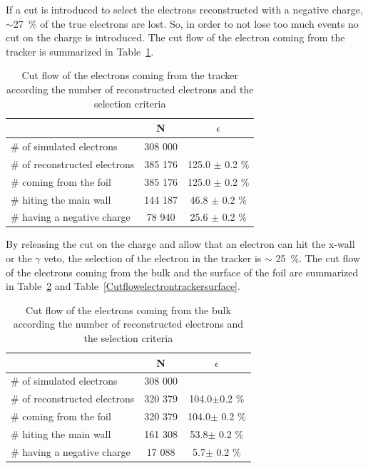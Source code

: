 \documentclass[main.tex]{subfiles}
\begin{document}
\bigskip 


\noindent If a cut is introduced to select the electrons reconstructed with a negative charge, $\sim$27~\% of the true electrons are lost. So, in order to not lose too much events no cut on the charge is introduced.  The cut flow of the electron coming from the tracker is summarized in Table~\ref{Cutflowelectrontracker}. 

\begin{table}[h!]
\begin{center}
\begin{tabular}{l|c|c}
 & N & $\epsilon$ \\
\toprule
$\#$ of simulated electrons & 308 000 & \\
\hline
$\#$ of reconstructed electrons & 385 176 & 125.0 $\pm$ 0.2 \% \\
$\#$ coming from the foil       & 385 176 & 125.0 $\pm$ 0.2 \%\\
$\#$ hiting the main wall       & 144 187 & 46.8  $\pm$ 0.2 \%\\
$\#$ having a negative charge   & 78 940  & 25.6  $\pm$ 0.2 \%\\
\bottomrule
\end{tabular}
\end{center}
\caption{Cut flow of the electrons coming from the tracker according the number of reconstructed electrons and the selection criteria}
\label{Cutflowelectrontracker}
\end{table}


\bigskip


\noindent By releasing the cut on the charge and allow that an electron can hit the x-wall or the $\gamma$ veto, the selection of the electron in the tracker is  $\sim$ 25~\%. The cut flow of the electrons coming from the bulk and the surface of the foil are summarized in Table~\ref{Cutflowelectrontrackerbulk} and Table~\ref{Cutflowelectrontrackersurface}.


\begin{table}[h!]
\begin{center}
\begin{tabular}{l|c|c}
 & N & $\epsilon$ \\
\toprule
$\#$ of simulated electrons & 308 000 & \\
\hline
$\#$ of reconstructed electrons & 320 379 & 104.0$ \pm $0.2 \% \\
$\#$ coming from the foil       & 320 379 & 104.0$ \pm$ 0.2 \%\\
$\#$ hiting the main wall       & 161 308 & 53.8$ \pm$ 0.2 \%\\
$\#$ having a negative charge   & 17 088  & 5.7$ \pm$ 0.2 \%\\
\bottomrule
\end{tabular}
\end{center}
\caption{Cut flow of the electrons coming from the bulk according the number of reconstructed electrons and the selection criteria}
\label{Cutflowelectrontrackerbulk}
\end{table}
\end{document}
